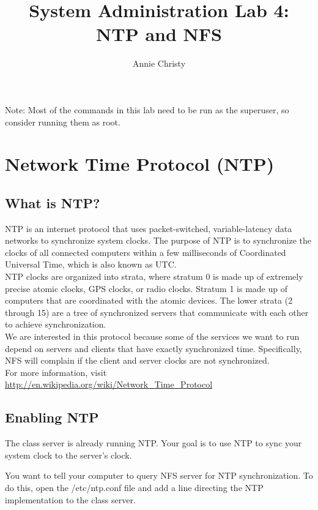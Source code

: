 \documentclass[11pt]{article}
\title{System Administration Lab 4: NTP and NFS\vspace{-2ex}}
\author{Annie Christy}
\date{}
\begin{document}
\maketitle

Note: Most of the commands in this lab need to be run as the superuser, so consider running them as root.

\section*{Network Time Protocol (NTP)}

\subsection*{What is NTP?}

\indent\indent NTP is an internet protocol that uses packet-switched, variable-latency data networks to synchronize system clocks. The purpose of NTP is to synchronize the clocks of all connected computers within a few milliseconds of Coordinated Universal Time, which is also known as UTC. \\
		
		NTP clocks are organized into strata, where stratum 0 is made up of extremely precise atomic clocks, GPS clocks, or radio clocks. Stratum 1 is made up of computers that are coordinated with the atomic devices. The lower strata (2 through 15) are a tree of synchronized servers that communicate with each other to achieve synchronization. \\
		
	   We are interested in this protocol because some of the services we want to run depend on servers and clients that have exactly synchronized time. Specifically, NFS will complain if the client and server clocks are not synchronized. \\
	
	
For more information, visit 
\url{http://en.wikipedia.org/wiki/Network_Time_Protocol}
	
	\subsection*{Enabling NTP}
	
\indent\indent The class server is already running NTP. Your goal is to use NTP to sync your system clock to the server's clock. 

	You want to tell your computer to query NFS server for NTP synchronization. To do this, open the /etc/ntp.conf file and add a line directing the NTP implementation to the class server.
	
\end{document}
